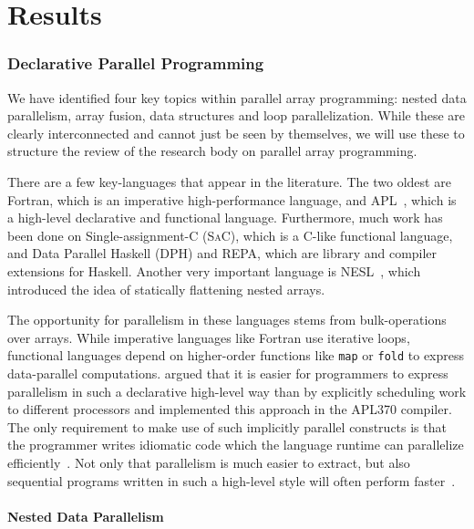 \documentclass[a4paper]{article}
\newcommand{\sac}{S\textsc{a}C}
\begin{document}
\newpage{}
\part{Results}
\label{part:results}

\section{Declarative Parallel Programming}
\label{sec:declarative-parallel-programming}

We have identified four key topics within parallel array programming:
nested data parallelism, array fusion, data structures and loop
parallelization. While these are clearly interconnected and cannot
just be seen by themselves, we will use these to structure the review
of the research body on parallel array programming.

There are a few key-languages that appear in the literature. The two
oldest are Fortran, which is an imperative
high-performance language, and APL~\cite{Iverson1962Programming},
which is a high-level declarative and functional
language. Furthermore, much work has been done on Single-assignment-C
(\sac), which is a C-like functional language, and Data
Parallel Haskell (DPH) and REPA, which are library and
compiler extensions for Haskell. Another very important language is
NESL~\cite{Blelloch1993NESL}, which introduced the idea of statically
flattening nested arrays.

The opportunity for parallelism in these languages stems from
bulk-operations over arrays. While imperative languages like Fortran
use iterative loops, functional languages depend on higher-order
functions like \texttt{map} or \texttt{fold} to express data-parallel
computations. \citet{Ching:1990:APA:97808.97826} argued that it is
easier for programmers to express parallelism in such a declarative
high-level way than by explicitly scheduling work to different
processors and implemented this approach in the APL370 compiler. The
only requirement to make use of such implicitly parallel constructs is
that the programmer writes idiomatic code which the language runtime
can parallelize
efficiently~\cite{Bernecky:2015:AEP:2774959.2774962}. Not only that
parallelism is much easier to extract, but also sequential programs
written in such a high-level style will often perform
faster~\cite{Bernecky:2015:AEP:2774959.2774962}.

\subsection{Nested Data Parallelism}
\label{sec:nest-data-parall}
\end{document}
